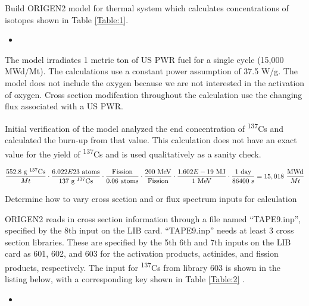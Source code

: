 \documentclass[11pt,notitlepage]{article}
\newcommand{\tss}{\textsuperscript}
\newcommand{\inputdeck}[2]{
\begin{itemize}
\item[]
\end{itemize}
}
\newcommand{\inputdeckpages}[4]{
\begin{itemize}
\item[]
\end{itemize}
}
\newcommand{\cmark}{\ding{51}}%
\newcommand{\done}{\rlap{$\square$}{\raisebox{2pt}{\large\hspace{1pt}\cmark}}%
  \hspace{-2.5pt}}
\begin{document}
\begin{todolist}
\item[\done]{Build ORIGEN2 model for thermal system which
  calculates concentrations of isotopes shown in
  Table \ref{Table:1}.}

  \inputdeck{../Origen2/TAPE5}{PWR Input Deck}

  The model irradiates 1 metric ton of US PWR fuel for a single
  cycle (15,000 MWd/Mt). The calculations use a constant power assumption
  of 37.5 W/g. The model does not include the oxygen because
  we are not interested in the activation of oxygen.
  Cross section modifcation throughout the calculation
  use the changing flux associated with a US PWR. 

  Initial verification of the model analyzed the end concentration of
  \tss{137}Cs and calculated the burn-up from that value. This calculation
  does not have an exact value for the yield of \tss{137}Cs and is
  used qualitatively as a sanity check.

  \begin{equation*}
    \frac{552.8\ \text{g \tss{137}Cs}}{Mt}\cdot
    \frac{6.022E23\ \text{atoms}}{137\ \text{g \tss{137}Cs}}\cdot
    \frac{\text{Fission}}{0.06\ \text{atoms}}\cdot
    \frac{200\ \text{MeV}}{\text{Fission}}\cdot
    \frac{1.602E-19\ \text{MJ}}{1\ \text{MeV}}\cdot
    \frac{1\ \text{day}}{86400\ \text{s}}=15,018\ \frac{\text{MWd}}{Mt}
  \end{equation*}

\item[\done]{Determine how to vary cross section and or flux spectrum
  inputs for calculation}
  
  ORIGEN2 reads in cross section information through a file
  named ``TAPE9.inp'', specified by the 8th input on the LIB card.
  ``TAPE9.inp'' needs at least 3 cross section libraries. These
  are specified by the 5th 6th and 7th inputs on the LIB card as
  601, 602, and 603 for the activation products, actinides, and
  fission products, respectively. The input for \tss{137}Cs
  from library 603 is shown in the listing below, with
  a corresponding key shown in Table \ref{Table:2} \cite{croff1980user}.
  
  \inputdeckpages{../Origen2/TAPE9_BANK}{\tss{137}Cs cross section
    library 603 input}{5066}{5067}


\end{todolist}
\end{document}
